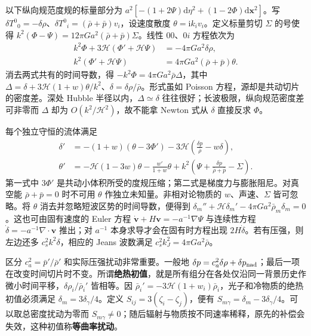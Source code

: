 以下纵向规范度规的标量部分为 $a^2[-(1+2\Psi)\mathrm d\eta^2+(1-2\Phi)\mathrm d\bm x^2]$。写 $\delta T^0{}_0=-\delta\rho$、$\delta T^0{}_i=(\bar\rho+\bar p)v_i$，设速度散度 $\theta=\mathrm i k_iv_i$。定义标量剪切 $\Sigma$ 的号使得 $k^2(\Phi-\Psi)=12\pi G a^2(\bar\rho+\bar p)\Sigma$。线性 $00$、$0i$ 方程依次为
\begin{align}
 k^2\Phi+3\mathcal H(\Phi'+\mathcal H\Psi)&=-4\pi G a^2\delta\rho,\nonumber\\
 k^2(\Phi'+\mathcal H\Psi)&=4\pi G a^2(\bar\rho+\bar p)\theta .
 \label{eq:gw-d-constraints}
\end{align}
消去两式共有的时间导数，得 $-k^2\Phi=4\pi G a^2\bar\rho\Delta$，其中 $\Delta=\delta+3\mathcal H(1+w)\theta/k^2$、$\delta=\delta\rho/\bar\rho$。形式虽如 Poisson 方程，源却是共动切片的密度差。深处 Hubble 半径以内，$\Delta\simeq\delta$ 往往很好；长波极限，纵向规范密度差可非零而 $\Delta$ 却为 $O(k^2/\mathcal H^2)$，故不能拿 Newton 式从 $\delta$ 直接反求 $\Phi$。

每个独立守恒的流体满足
\begin{align}
 \delta'&=-(1+w)(\theta-3\Phi')
       -3\mathcal H\left(\frac{\delta p}{\bar\rho}-w\delta\right),\nonumber\\
 \theta'&=-\mathcal H(1-3w)\theta-\frac{w'}{1+w}\theta
       +k^2\left(\Psi+\frac{\delta p}{\bar\rho+\bar p}-\Sigma\right).
 \label{eq:gw-d-fluid}
\end{align}
第一式中 $3\Phi'$ 是共动小体积所受的度规压缩；第二式是梯度力与膨胀阻尼。对真空能 $\bar\rho+\bar p=0$ 时不可用 $\theta$ 作独立未知量。非相对论物质的 $w$、声速、$\Sigma$ 皆可忽略。将 $\theta$ 消去并忽略短波区势的时间导数，便得到 $\delta_m''+\mathcal H\delta_m'-4\pi G a^2\bar\rho_m\delta_m=0$。这也可由固有速度的 Euler 方程 $\dot{\bm v}+H\bm v=-a^{-1}\nabla\Psi$ 与连续性方程 $\dot\delta=-a^{-1}\nabla\cdot\bm v$ 推出；对 $a^{-1}$ 本身求导才会在固有时方程出现 $2H\dot\delta$。若有压强，则左边还多 $c_s^2k^2\delta$，相应的 Jeans 波数满足 $c_s^2k_J^2=4\pi G a^2\bar\rho$。

区分 $c_a^2=\bar p'/\bar\rho'$ 和实际压强扰动非常重要。一般地 $\delta p=c_a^2\delta\rho+\delta p_{\rm nad}$；最后一项在改变时间切片时不变。所谓\textbf{绝热初值}，就是所有组分在各处仅沿同一背景历史作微小时间平移，$\delta\rho_i/\bar\rho_i'$ 皆相等。因 $\bar\rho_i'=-3\mathcal H(1+w_i)\bar\rho_i$，光子和冷物质的绝热初值必须满足 $\delta_m=3\delta_\gamma/4$。定义 $S_{ij}=3(\zeta_i-\zeta_j)$，便有 $S_{m\gamma}=\delta_m-3\delta_\gamma/4$。可以取总密度扰动为零而 $S_{m\gamma}\ne0$；随后辐射与物质按不同速率稀释，原先的补偿会失效，这种初值称\textbf{等曲率扰动}。


